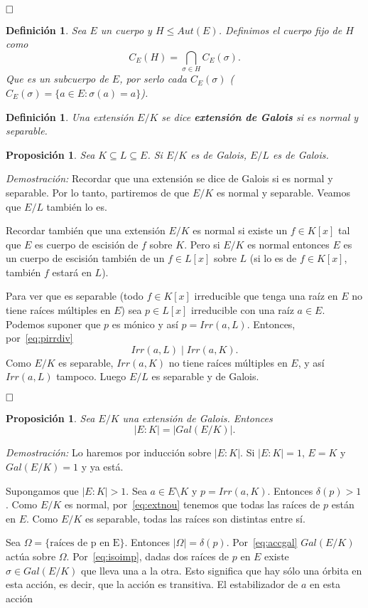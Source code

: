 \documentclass[12pt]{article}
\newtheorem{proposition}[theorem]{Proposición}
\newtheorem{definition}[theorem]{Definición}
\begin{document}
$\hfill \square$

\begin{definition} Sea $E$ un cuerpo y $H \leq Aut(E)$. Definimos el cuerpo fijo de $H$ como $$C_{E}(H) = \bigcap_{\sigma \in H} C_{E}(\sigma).$$ Que es un subcuerpo de $E$, por serlo cada $C_{E}(\sigma)$ ($C_{E}(\sigma) = \lbrace a \in E :\sigma (a) = a \rbrace$).
\end{definition}
\begin{definition} Una extensión $E/K$ se dice \textbf{extensión de Galois} si es normal y separable.
\end{definition}

\begin{proposition}\label{eq:cuerpIntGal} Sea $K\subseteq L \subseteq E$. Si $E/K$ es de Galois, $E/L$ es de Galois.
\end{proposition}
\emph{Demostración: }Recordar que una extensión se dice de Galois si es normal y separable. Por lo tanto, partiremos de que $E/K$ es normal y separable. Veamos que $E/L$ también lo es.

Recordar también que una extensión $E/K$ es normal si existe un $f \in K[x]$ tal que $E$ es cuerpo de escisión de $f$ sobre $K$. Pero si $E/K$ es normal entonces $E$ es un cuerpo de escisión también de un $f \in L[x]$ sobre $L$ (si lo es de $f \in K[x]$, también $f$ estará en $L$).

Para ver que es separable (todo $f \in K[x]$ irreducible que tenga una raíz en $E$ no tiene raíces múltiples en $E$) sea $p \in L[x]$ irreducible con una raíz $a \in E$. Podemos suponer que $p$ es mónico y así $p = Irr(a,L)$. Entonces, por~\ref{eq:pirrdiv} $$Irr(a,L) \mid Irr(a,K).$$ Como $E/K$ es separable, $Irr(a,K)$ no tiene raíces múltiples en $E$, y así $Irr(a,L)$ tampoco. Luego $E/L$ es separable y de Galois.

$\hfill \square$

\begin{proposition}\label{eq:extGalois} Sea $E/K$ una extensión de Galois. Entonces $$|E:K| = |Gal(E/K)|.$$
\end{proposition}
\emph{Demostración: } Lo haremos por inducción sobre $|E:K|$. Si $|E:K| = 1$, $E=K$ y $Gal(E/K)= 1$ y ya está.

Supongamos que $|E:K|>1$. Sea $a \in E \setminus K$ y $p = Irr(a,K)$. Entonces $\delta(p)>1$. Como $E/K$ es normal, por~\ref{eq:extnou} tenemos que todas las raíces de $p$ están en $E$. Como $E/K$ es separable, todas las raíces son distintas entre sí.

Sea $\Omega = \lbrace \text{raíces de p en E} \rbrace$. Entonces $|\Omega | = \delta(p)$. Por~\ref{eq:accgal} $Gal(E/K)$ actúa sobre $\Omega$. Por~\ref{eq:isoimp}, dadas dos raíces de $p$ en $E$ existe $\sigma \in Gal(E/K)$ que lleva una a la otra. Esto significa que hay sólo una órbita en esta acción, es decir, que la acción es transitiva. El estabilizador de $a$ en esta acción 
\end{document}
